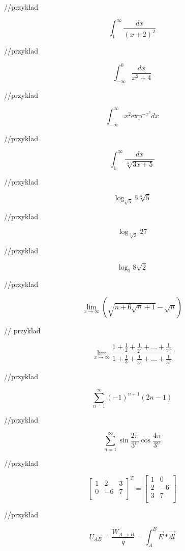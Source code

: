 \documentclass[a4paper]{article}
\begin{document}
//przyklad 

$$\int_{1}^{\infty}\frac{dx}{(x+2)^2}$$

//przyklad

$$\int_{-\infty}^{0}\frac{dx}{x^2 + 4}$$

//przyklad 

$$\int_{-\infty}^{\infty}x^2 \text{exp}^{-x^3}dx$$

//przyklad 

$$\int_{1}^{\infty}\frac{dx}{\sqrt[3]{3x+5}}$$

//przyklad 

$$\log_{\sqrt{5}} 5\sqrt[3]{5}$$

//przyklad 

$$\log_{\sqrt[3]{3}} 27$$

//przyklad

$$\log_{2} 8\sqrt{2}$$

//przyklad 


$$\lim_{x\to\infty} \left(\sqrt{n + 6 \sqrt{n} + 1} - \sqrt{n}\right)$$

// przyklad

$$ \lim_{x\to\infty} \frac{1 + \frac{1}{2} + \frac{1}{2^2} + ... + \frac{1}{2^n}}{1 + \frac{1}{3} + \frac{1}{3^2} + ... + \frac{1}{3^n}} $$

//przyklad 

$$\sum_{n=1}^{\infty} (-1)^{n+1}(2n-1)$$

//przyklad 

$$\sum_{n=1}^{\infty} \sin\frac{2\pi}{3^n} \cos\frac{4\pi}{3^n} $$

//przyklad 

$$\left[ \begin{array}{ccc}
1 & 2 & 3  \\
0 & -6 & 7  \\
\end{array} \right]^T
=
\left[ \begin{array}{cc}
1 & 0  \\
2 & -6  \\
3 & 7 \\
\end{array} \right] $$

//przyklad 

$$U_{AB} = \frac{W_{A\to B}}{q} = \int_{A}^{B} \vec{E}* \vec{dl} $$
\end{document}
